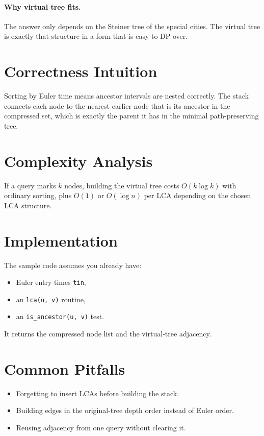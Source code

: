 \paragraph{Why virtual tree fits.}
The answer only depends on the Steiner tree of the special cities. The virtual tree is exactly that structure in a form
that is easy to DP over.

\section*{Correctness Intuition}

Sorting by Euler time means ancestor intervals are nested correctly. The stack connects each node to the nearest earlier
node that is its ancestor in the compressed set, which is exactly the parent it has in the minimal path-preserving tree.

\section*{Complexity Analysis}

If a query marks \(k\) nodes, building the virtual tree costs \(O(k \log k)\) with ordinary sorting, plus \(O(1)\) or
\(O(\log n)\) per LCA depending on the chosen LCA structure.

\section*{Implementation}

The sample code assumes you already have:

\begin{itemize}
  \item Euler entry times \texttt{tin},
  \item an \texttt{lca(u, v)} routine,
  \item an \texttt{is\_ancestor(u, v)} test.
\end{itemize}

It returns the compressed node list and the virtual-tree adjacency.

\section*{Common Pitfalls}

\begin{itemize}
  \item Forgetting to insert LCAs before building the stack.
  \item Building edges in the original-tree depth order instead of Euler order.
  \item Reusing adjacency from one query without clearing it.
\end{itemize}

